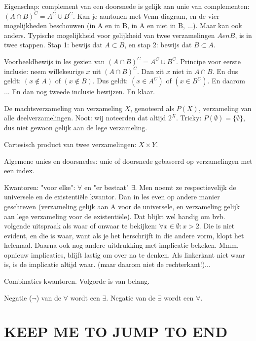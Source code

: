 \documentclass{article}
\begin{document}
Eigenschap: complement van een doorsnede is gelijk aan unie van complementen: $(A \cap B)^C = A^C \cup B^C$. Kan je aantonen met Venn-diagram, en de vier mogelijkheden beschouwen (in A en in B, in A en niet in B, ...). Maar kan ook anders. Typische mogelijkheid voor gelijkheid van twee verzamelingen $A en B$, is in twee stappen. Stap 1: bewijs dat $A \subset B$, en stap 2: bewijs dat $B \subset A$. 

Voorbeeldbewijs in les gezien van $(A \cap B)^C = A^C \cup B^C$. Principe voor eerste inclusie: neem willekeurige $x$ uit $(A \cap B)^C$. Dan zit  $x$ niet in $A \cap B$. En dus geldt: $(x\notin A)$ of $(x\notin B)$. Dus geldt: $(x \in A^C)$ of $(x\in B^C)$. En daarom ... En dan nog tweede inclusie bewijzen. En klaar. 

De machtsverzameling van verzameling $X$, genoteerd als $P(X)$, verzameling van alle deelverzamelingen. Noot: wij noteerden dat altijd $2^X$. Tricky: $P(\emptyset) = \{ \emptyset \}$, dus niet gewoon gelijk aan de lege verzameling. 

Cartesisch product van twee verzamelingen: $X \times Y$. 

Algemene unies en doorsnedes: unie of doorsnede gebaseerd op verzamelingen met een index. 

Kwantoren: "voor elke": $\forall$  en "er bestaat" $\exists$. Men noemt ze respectievelijk  de universele en de existenti\"ele kwantor. Dan in les even op andere manier geschreven (verzameling gelijk aan A voor de universele, en verzameling gelijk aan lege verzameling voor de existenti\"ele). Dat blijkt wel handig om bvb. volgende uitspraak als waar of onwaar te bekijken: $\forall x \in \emptyset : x>2$. Die is niet evident, en die is waar, want als je het herschrijft in die andere vorm, klopt het helemaal. 
Daarna ook nog andere uitdrukking met implicatie bekeken. Mmm, opnieuw implicaties, blijft lastig om over na te denken. Als linkerkant niet waar is, is de implicatie altijd waar. (maar daarom niet de rechterkant!)... 

Combinaties kwantoren. Volgorde is van belang. 

Negatie ($\lnot$) van de $\forall$ wordt een $\exists$. Negatie van de $\exists$ wordt een $\forall$. 



\section{KEEP ME TO JUMP TO END}
\end{document}
